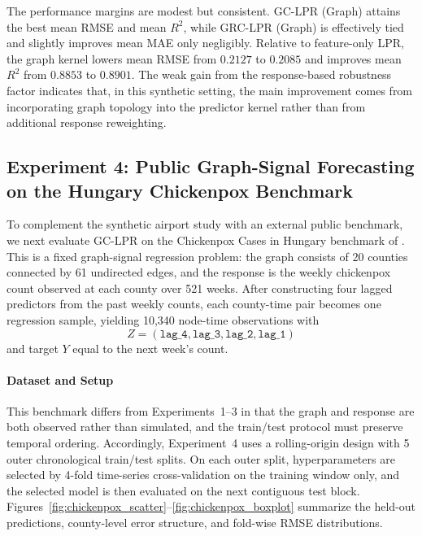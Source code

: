\documentclass[final,1p,times,authoryear]{elsarticle}
\begin{document}
The performance margins are modest but consistent. GC-LPR (Graph) attains the best mean RMSE and mean \(R^2\), while GRC-LPR (Graph) is effectively tied and slightly improves mean MAE only negligibly. Relative to feature-only LPR, the graph kernel lowers mean RMSE from \(0.2127\) to \(0.2085\) and improves mean \(R^2\) from \(0.8853\) to \(0.8901\). The weak gain from the response-based robustness factor indicates that, in this synthetic setting, the main improvement comes from incorporating graph topology into the predictor kernel rather than from additional response reweighting.

\subsection{Experiment 4: Public Graph-Signal Forecasting on the Hungary Chickenpox Benchmark}
\label{s:exp_chickenpox}

To complement the synthetic airport study with an external public benchmark, we next evaluate GC-LPR on the Chickenpox Cases in Hungary benchmark of \citet{rozemberczki2021chickenpox}. This is a fixed graph-signal regression problem: the graph consists of 20 counties connected by 61 undirected edges, and the response is the weekly chickenpox count observed at each county over 521 weeks. After constructing four lagged predictors from the past weekly counts, each county-time pair becomes one regression sample, yielding 10{,}340 node-time observations with
\[
Z = (\texttt{lag\_4}, \texttt{lag\_3}, \texttt{lag\_2}, \texttt{lag\_1})
\]
and target \(Y\) equal to the next week's count.

\paragraph{\textbf{Dataset and Setup}}
This benchmark differs from Experiments~1--3 in that the graph and response are both observed rather than simulated, and the train/test protocol must preserve temporal ordering. Accordingly, Experiment~4 uses a rolling-origin design with 5 outer chronological train/test splits. On each outer split, hyperparameters are selected by 4-fold time-series cross-validation on the training window only, and the selected model is then evaluated on the next contiguous test block. Figures~\ref{fig:chickenpox_scatter}--\ref{fig:chickenpox_boxplot} summarize the held-out predictions, county-level error structure, and fold-wise RMSE distributions.
\end{document}
